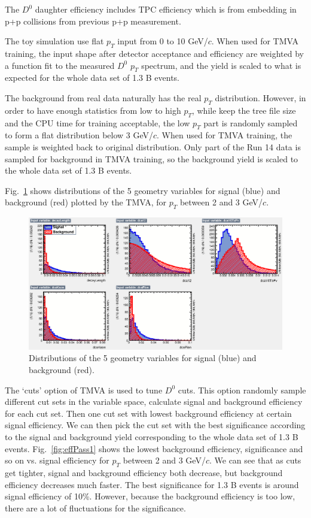 \documentclass[a4paper]{article}
\begin{document}
The $D^0$ daughter efficiency includes TPC efficiency which is from embedding in p+p collisions from previous p+p measurement.

The toy simulation use flat $p_T$ input from 0 to 10 GeV/$c$. When used for TMVA training, the input shape after detector acceptance and efficiency are weighted by a function fit to the measured $D^0$ $p_T$ spectrum, and the yield is scaled to what is expected for the whole data set of 1.3 B events.

The background from real data naturally has the real $p_T$ distribution. However, in order to have enough statistics from low to high $p_T$, while keep the tree file size and the CPU time for training acceptable, the low $p_T$ part is randomly sampled to form a flat distribution below 3 GeV/$c$. When used for TMVA training, the sample is weighted back to original distribution. Only part of the Run 14 data is sampled for background in TMVA training, so the background yield is scaled to the whole data set of 1.3 B events.

Fig.~\ref{fig:variables} shows distributions of the 5 geometry variables for signal (blue) and background (red) plotted by the TMVA, for $p_T$ between 2 and 3 GeV/$c$.

\begin{figure}[htbp]
\centering
\includegraphics[keepaspectratio,width=1.0\textwidth]{fig/variables_id_c1.eps}
\caption{Distributions of the 5 geometry variables for signal (blue) and background (red).}
\label{fig:variables}
\end{figure}

The `cuts' option of TMVA is used to tune $D^0$ cuts. This option randomly sample different cut sets in the variable space, calculate signal and background efficiency for each cut set. Then one cut set with lowest background efficiency at certain signal efficiency. We can then pick the cut set with the best significance according to the signal and background yield corresponding to the whole data set of 1.3 B events. Fig.~\ref{fig:effPass1} shows the lowest background efficiency, significance and so on vs. signal efficiency for $p_T$ between 2 and 3 GeV/$c$. We can see that as cuts get tighter, signal and background efficiency both decrease, but background efficiency decreases much faster. The best significance for 1.3 B events is around signal efficiency of 10\%. However, because the background efficiency is too low, there are a lot of fluctuations for the significance.
\end{document}
